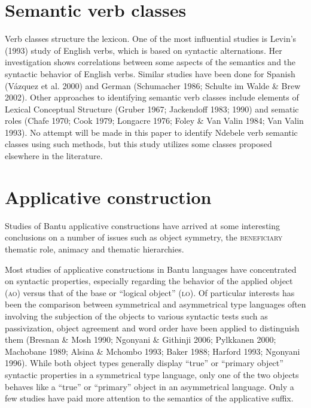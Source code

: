 \documentclass[output=paper]{langsci/langscibook}
\begin{document}
\section{Semantic verb classes}

Verb classes structure the lexicon. One of the most influential studies is Levin’s (1993) study of English verbs, which is based on syntactic alternations. Her investigation shows correlations between some aspects of the semantics and the syntactic behavior of English verbs. Similar studies have been done for Spanish (Vázquez et al. 2000) and German (Schumacher 1986; Schulte im Walde \& Brew 2002). Other approaches to identifying semantic verb classes include elements of Lexical Conceptual Structure (Gruber 1967; Jackendoff 1983; 1990) and sematic roles (Chafe 1970; Cook 1979; Longacre 1976; Foley \& Van Valin 1984; Van Valin 1993). No attempt will be made in this paper to identify Ndebele verb semantic classes using such methods, but this study utilizes some classes proposed elsewhere in the literature.

\section{Applicative construction }

Studies of Bantu applicative constructions have arrived at some interesting conclusions on a number of issues such as object symmetry, the \textsc{beneficiary} thematic role, animacy and thematic hierarchies. 

Most studies of applicative constructions in Bantu languages have concentrated on syntactic properties, especially regarding the behavior of the applied object (\textsc{ao}) versus that of the base or “logical object” (\textsc{lo}). Of particular interests has been the comparison between symmetrical and asymmetrical type languages often involving the subjection of the objects to various syntactic tests such as passivization, object agreement and word order have been applied to distinguish them (Bresnan \& Mosh 1990; Ngonyani \& Githinji 2006; Pylkkanen 2000; Machobane 1989; Alsina \& Mchombo 1993; Baker 1988; Harford 1993; Ngonyani 1996). While both object types generally display “true” or “primary object” syntactic properties in a symmetrical type language, only one of the two objects behaves like a “true” or “primary” object in an asymmetrical language. Only a few studies have paid more attention to the semantics of the applicative suffix. 
\end{document}
